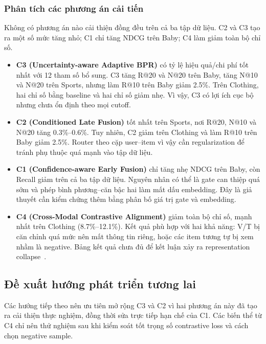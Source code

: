 \subsubsection{Phân tích các phương án cải tiến}

Không có phương án nào cải thiện đồng đều trên cả ba tập dữ liệu. C2 và C3 tạo ra một số mức tăng nhỏ; C1 chỉ tăng NDCG trên Baby; C4 làm giảm toàn bộ chỉ số.

\begin{itemize}[leftmargin=*,labelsep=6pt]
    \item \textbf{C3 (Uncertainty-aware Adaptive BPR)} có tỷ lệ hiệu quả/chi phí tốt nhất với 12 tham số bổ sung. C3 tăng R@20 và N@20 trên Baby, tăng N@10 và N@20 trên Sports, nhưng làm R@10 trên Baby giảm 2.5\%. Trên Clothing, hai chỉ số bằng baseline và hai chỉ số giảm nhẹ. Vì vậy, C3 có lợi ích cục bộ nhưng chưa ổn định theo mọi cutoff.

    \item \textbf{C2 (Conditioned Late Fusion)} tốt nhất trên Sports, nơi R@20, N@10 và N@20 tăng 0.3\%--0.6\%. Tuy nhiên, C2 giảm trên Clothing và làm R@10 trên Baby giảm 2.5\%. Router theo cặp user--item vì vậy cần regularization để tránh phụ thuộc quá mạnh vào tập dữ liệu.

    \item \textbf{C1 (Confidence-aware Early Fusion)} chỉ tăng nhẹ NDCG trên Baby, còn Recall giảm trên cả ba tập dữ liệu. Nguyên nhân có thể là gate can thiệp quá sớm và phép bình phương--căn bậc hai làm mất dấu embedding. Đây là giả thuyết cần kiểm chứng thêm bằng phân bố giá trị gate và embedding.

    \item \textbf{C4 (Cross-Modal Contrastive Alignment)} giảm toàn bộ chỉ số, mạnh nhất trên Clothing (8.7\%--12.1\%). Kết quả phù hợp với hai khả năng: V/T bị căn chỉnh quá mức nên mất thông tin riêng, hoặc các item tương tự bị xem nhầm là negative. Bảng kết quả chưa đủ để kết luận xảy ra representation collapse~\cite{ma2025rearm}.
\end{itemize}


\subsection{Đề xuất hướng phát triển tương lai}

Các hướng tiếp theo nên ưu tiên mở rộng C3 và C2 vì hai phương án này đã tạo ra cải thiện thực nghiệm, đồng thời sửa trực tiếp hạn chế của C1. Các biến thể từ C4 chỉ nên thử nghiệm sau khi kiểm soát tốt trọng số contrastive loss và cách chọn negative sample.

